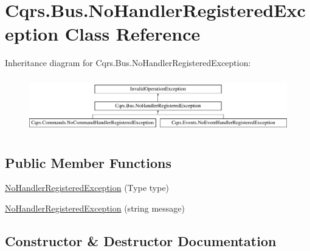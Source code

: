 \hypertarget{classCqrs_1_1Bus_1_1NoHandlerRegisteredException}{}\section{Cqrs.\+Bus.\+No\+Handler\+Registered\+Exception Class Reference}
\label{classCqrs_1_1Bus_1_1NoHandlerRegisteredException}
Inheritance diagram for Cqrs.\+Bus.\+No\+Handler\+Registered\+Exception\+:\begin{figure}[H]
\begin{center}
\leavevmode
\includegraphics[height=2.427746cm]{classCqrs_1_1Bus_1_1NoHandlerRegisteredException}
\end{center}
\end{figure}
\subsection*{Public Member Functions}
\begin{DoxyCompactItemize}
\item 
\hyperlink{classCqrs_1_1Bus_1_1NoHandlerRegisteredException_ae74b3c88aed92d6bf354a5aaf4b42e13}{No\+Handler\+Registered\+Exception} (Type type)
\item 
\hyperlink{classCqrs_1_1Bus_1_1NoHandlerRegisteredException_a6f163c9b3fe405f817f97ac8187bf691}{No\+Handler\+Registered\+Exception} (string message)
\end{DoxyCompactItemize}


\subsection{Constructor \& Destructor Documentation}
\mbox{\label{classCqrs_1_1Bus_1_1NoHandlerRegisteredException_ae74b3c88aed92d6bf354a5aaf4b42e13}} 
